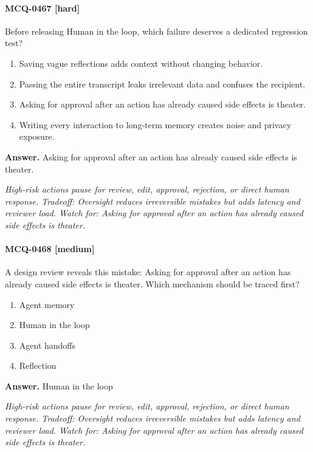 \paragraph{MCQ-0467 [hard]} Before releasing Human in the loop, which failure deserves a dedicated regression test?
\begin{enumerate}[label=\Alph*.]
\item Saving vague reflections adds context without changing behavior.
\item Passing the entire transcript leaks irrelevant data and confuses the recipient.
\item Asking for approval after an action has already caused side effects is theater.
\item Writing every interaction to long-term memory creates noise and privacy exposure.
\end{enumerate}
\noindent\textbf{Answer.} Asking for approval after an action has already caused side effects is theater.
\par\textit{High-risk actions pause for review, edit, approval, rejection, or direct human response. Tradeoff: Oversight reduces irreversible mistakes but adds latency and reviewer load. Watch for: Asking for approval after an action has already caused side effects is theater.}
\paragraph{MCQ-0468 [medium]} A design review reveals this mistake: Asking for approval after an action has already caused side effects is theater. Which mechanism should be traced first?
\begin{enumerate}[label=\Alph*.]
\item Agent memory
\item Human in the loop
\item Agent handoffs
\item Reflection
\end{enumerate}
\noindent\textbf{Answer.} Human in the loop
\par\textit{High-risk actions pause for review, edit, approval, rejection, or direct human response. Tradeoff: Oversight reduces irreversible mistakes but adds latency and reviewer load. Watch for: Asking for approval after an action has already caused side effects is theater.}

